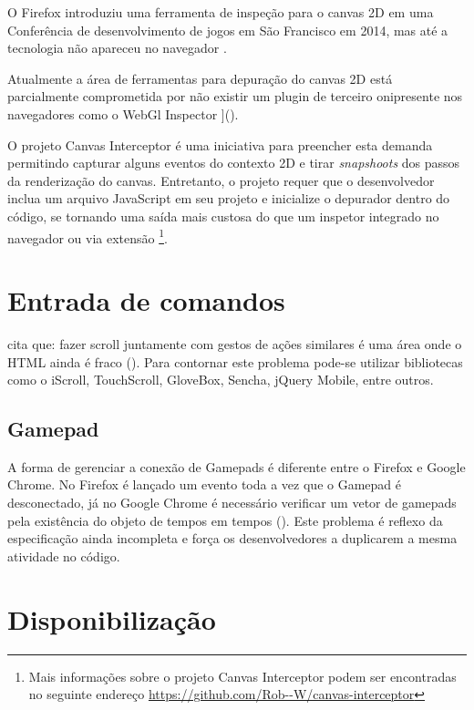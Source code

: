 O Firefox introduziu uma ferramenta de inspeção para o canvas 2D
em uma Conferência de desenvolvimento de jogos em São Francisco em 2014,
mas até a tecnologia não apareceu no navegador \autocite{firefoxCanvasDebug}.

Atualmente a área de ferramentas para depuração do canvas 2D está
parcialmente comprometida por não existir um plugin de terceiro
onipresente nos navegadores como o WebGl Inspector ]().

O projeto Canvas Interceptor é uma iniciativa para preencher
esta demanda permitindo capturar alguns eventos do contexto 2D e
tirar \textit{snapshoots} dos passos da renderização do canvas.
Entretanto, o projeto requer que o desenvolvedor inclua um arquivo
JavaScript em seu projeto e inicialize o depurador dentro do código,
se tornando uma saída mais custosa do que um inspetor integrado
no navegador ou via extensão \footnote{Mais informações sobre o
projeto Canvas Interceptor podem ser encontradas no seguinte endereço
\url{https://github.com/Rob--W/canvas-interceptor}}.

\section{Entrada de comandos}

\citet[p. 9]{aSeriousContender} cita que: fazer scroll juntamente
com gestos de ações similares é uma área onde o HTML ainda é
fraco (). Para contornar este problema pode-se utilizar bibliotecas como o
iScroll, TouchScroll, GloveBox, Sencha, jQuery Mobile, entre outros.

\subsection{Gamepad}

A forma de gerenciar a conexão de Gamepads é diferente entre o Firefox
e Google Chrome. No Firefox é lançado um evento toda a vez que o
Gamepad é desconectado, já no Google Chrome é necessário verificar
um vetor de gamepads pela existência do objeto de tempos em tempos
\autocite{gamepad} (). Este problema é
reflexo da especificação ainda incompleta e força os desenvolvedores
a duplicarem a mesma atividade no código.

\section{Disponibilização}


